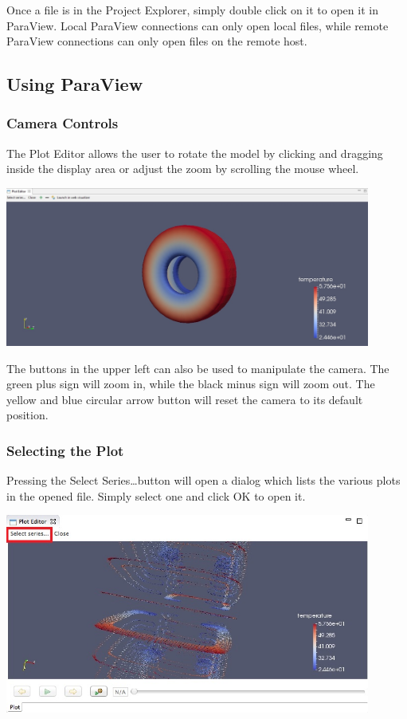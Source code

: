 Once a file is in the Project Explorer, simply double click on it to open it in
ParaView. Local ParaView connections can only open local files, while remote ParaView connections can only open files on the remote host.

\subsection{Using ParaView}

\subsubsection{Camera Controls}

The Plot Editor allows the user to rotate the model by clicking and dragging
inside the display area or adjust the zoom by scrolling the mouse wheel.

\begin{center}
\includegraphics[width=12cm]{images/ParaViewPlotEditor}
\end{center}

The buttons in the upper left can also be used to manipulate the camera. The
green plus sign will zoom in, while the black minus sign will zoom out. The
yellow and blue circular arrow button will reset the camera to its default
position.

\subsubsection{Selecting the Plot}

Pressing the Select Series\ldots button will open a dialog which lists the
various plots in the opened file. Simply select one and click OK to open it. 

\begin{center}
\includegraphics[width=12cm]{images/ParaViewPlotEditorSelectSeriesButton}
\end{center}

